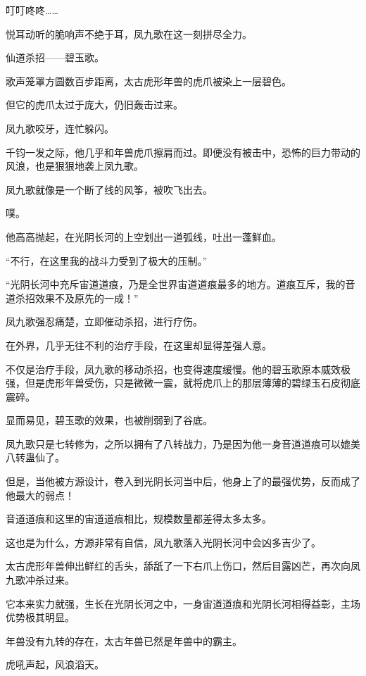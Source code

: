 
\begin{this_body}

叮叮咚咚……

悦耳动听的脆响声不绝于耳，凤九歌在这一刻拼尽全力。

仙道杀招——碧玉歌。

歌声笼罩方圆数百步距离，太古虎形年兽的虎爪被染上一层碧色。

但它的虎爪太过于庞大，仍旧轰击过来。

凤九歌咬牙，连忙躲闪。

千钧一发之际，他几乎和年兽虎爪擦肩而过。即便没有被击中，恐怖的巨力带动的风浪，也是狠狠地袭上凤九歌。

凤九歌就像是一个断了线的风筝，被吹飞出去。

噗。

他高高抛起，在光阴长河的上空划出一道弧线，吐出一蓬鲜血。

“不行，在这里我的战斗力受到了极大的压制。”

“光阴长河中充斥宙道道痕，乃是全世界宙道道痕最多的地方。道痕互斥，我的音道杀招效果不及原先的一成！”

凤九歌强忍痛楚，立即催动杀招，进行疗伤。

在外界，几乎无往不利的治疗手段，在这里却显得差强人意。

不仅是治疗手段，凤九歌的移动杀招，也变得速度缓慢。他的碧玉歌原本威效极强，但是虎形年兽受伤，只是微微一震，就将虎爪上的那层薄薄的碧绿玉石皮彻底震碎。

显而易见，碧玉歌的效果，也被削弱到了谷底。

凤九歌只是七转修为，之所以拥有了八转战力，乃是因为他一身音道道痕可以媲美八转蛊仙了。

但是，当他被方源设计，卷入到光阴长河当中后，他身上了的最强优势，反而成了他最大的弱点！

音道道痕和这里的宙道道痕相比，规模数量都差得太多太多。

这也是为什么，方源非常有自信，凤九歌落入光阴长河中会凶多吉少了。

太古虎形年兽伸出鲜红的舌头，舔舐了一下右爪上伤口，然后目露凶芒，再次向凤九歌冲杀过来。

它本来实力就强，生长在光阴长河之中，一身宙道道痕和光阴长河相得益彰，主场优势极其明显。

年兽没有九转的存在，太古年兽已然是年兽中的霸主。

虎吼声起，风浪滔天。


\end{this_body}
